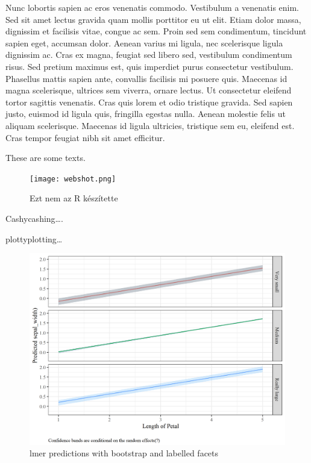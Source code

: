 \documentclass[
]{article}
\begin{document}
Nunc lobortis sapien ac eros venenatis commodo. Vestibulum a venenatis
enim. Sed sit amet lectus gravida quam mollis porttitor eu ut elit.
Etiam dolor massa, dignissim et facilisis vitae, congue ac sem. Proin
sed sem condimentum, tincidunt sapien eget, accumsan dolor. Aenean
varius mi ligula, nec scelerisque ligula dignissim ac. Cras ex magna,
feugiat sed libero sed, vestibulum condimentum risus. Sed pretium
maximus est, quis imperdiet purus consectetur vestibulum. Phasellus
mattis sapien ante, convallis facilisis mi posuere quis. Maecenas id
magna scelerisque, ultrices sem viverra, ornare lectus. Ut consectetur
eleifend tortor sagittis venenatis. Cras quis lorem et odio tristique
gravida. Sed sapien justo, euismod id ligula quis, fringilla egestas
nulla. Aenean molestie felis ut aliquam scelerisque. Maecenas id ligula
ultricies, tristique sem eu, eleifend est. Cras tempor feugiat nibh sit
amet efficitur.

These are some texts.

\begin{figure}[H]
\texttt{[image: webshot.png]}
\centering
\caption{Ezt nem az R készítette}
\label{fig:webshot_sjPlot}
\end{figure}

Cashycashing\ldots.

plottyplotting\ldots{}

\begin{figure}[H]

{\centering \includegraphics[width=0.9\linewidth]{cookbook_files/figure-latex/lmer_predictions-1} 

}

\caption{lmer predictions with bootstrap and labelled facets}\label{fig:lmer_predictions}
\end{figure}
\end{document}
